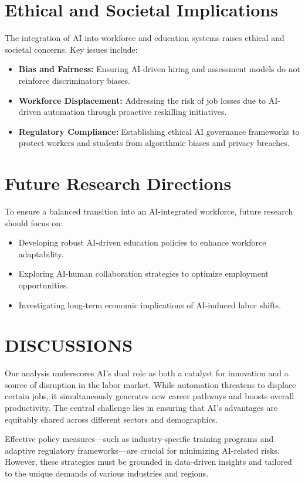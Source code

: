 \documentclass[a4paper,headinclude=on,footinclude=on,12pt,oneside]{scrbook}
\begin{document}
\section*{Ethical and Societal Implications}

The integration of AI into workforce and education systems raises ethical and societal concerns. Key issues include:
\begin{itemize}
	\item \textbf{Bias and Fairness:} Ensuring AI-driven hiring and assessment models do not reinforce discriminatory biases.
	\item \textbf{Workforce Displacement:} Addressing the risk of job losses due to AI-driven automation through proactive reskilling initiatives.
	\item \textbf{Regulatory Compliance:} Establishing ethical AI governance frameworks to protect workers and students from algorithmic biases and privacy breaches.
\end{itemize}

\section*{Future Research Directions}

To ensure a balanced transition into an AI-integrated workforce, future research should focus on:
\begin{itemize}
	\item Developing robust AI-driven education policies to enhance workforce adaptability.
	\item Exploring AI-human collaboration strategies to optimize employment opportunities.
	\item Investigating long-term economic implications of AI-induced labor shifts.
\end{itemize}

\section*{DISCUSSIONS}

Our analysis underscores AI’s dual role as both a catalyst for innovation and a source of disruption in the labor market. While automation threatens to displace certain jobs, it simultaneously generates new career pathways and boosts overall productivity. The central challenge lies in ensuring that AI’s advantages are equitably shared across different sectors and demographics.

Effective policy measures—such as industry-specific training programs and adaptive regulatory frameworks—are crucial for minimizing AI-related risks. However, these strategies must be grounded in data-driven insights and tailored to the unique demands of various industries and regions.
\end{document}
